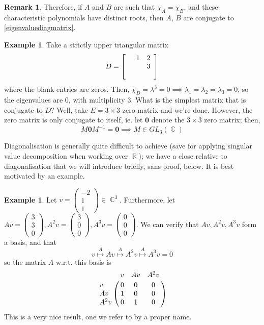 \documentclass[11pt]{amsart} %
\theoremstyle{definition}
\newtheorem{example}[definition]{Example}
\theoremstyle{definition}
\newtheorem{remark}[definition]{Remark}
\DeclareMathOperator{\R}{\mathbb{R}}
\DeclareMathOperator{\Com}{\mathbb{C}}
\numberwithin{equation}{section}
\begin{document}
\begin{remark}
	Therefore, if $A$ and $B$ are such that $\chi_A=\chi_B$, and these characteristic polynomials have distinct roots, then $A$, $B$ are conjugate to \eqref{eigenvaluediagmatrix}.
\end{remark}

\begin{example}
	Take a strictly upper triangular matrix
	$$ D = \left[ \begin{array}{ c c c }
	& 1 & 2 \\
	& & 3\\
	& & 
	\end{array} \right] $$
	where the blank entries are zeros. Then, $\chi_D = \lambda^3 = 0 \implies \lambda_1=\lambda_2=\lambda_3=0$, so the eigenvalues are 0, with multiplicity 3. What is the simplest matrix that is conjugate to $D$? Well, take $E= 3 \times 3$ zero matrix and we're done. However, the zero matrix is only conjugate to itself, ie. let $\mathbf{0}$ denote the $3 \times 3$ zero matrix; then,
	$$ M \mathbf{0} M^{-1} = \mathbf{0} \implies M \in GL_{3} (\Com) $$
\end{example}

Diagonalisation is generally quite difficult to achieve (save for applying singular value decomposition when working over $\R$); we have a close relative to diagonalisation that we will introduce briefly, sans proof, below. It is best motivated by an example.

\begin{example}
	Let $v = \left( \begin{array}{c} -2 \\ 1 \\ 1 \end{array} \right) \in \Com^3$. Furthermore, let $Av = \left( \begin{array}{c} 3 \\ 3 \\ 0 \end{array} \right), A^2 v = \left( \begin{array}{c} 3 \\ 0 \\0  \end{array} \right) , A^3 v = \left( \begin{array}{c} 0 \\ 0 \\ 0 \end{array} \right)  $. We can verify that $Av, A^2 v, A^3 v$ form a basis, and that
	$$ v \overset{A}{\longmapsto} Av \overset{A}{\longmapsto}  A^2 v \overset{A}{\longmapsto}  A^3 v = 0$$
	so the matrix $A$ w.r.t. this basis is
	$$\bordermatrix{  &v &Av &A^2 v \cr
		v& 0 &  0  & 0 \cr
		Av&1  &  0  & 0 \cr
		A^2 v& 0 &  1  & 0 } $$
	This is a very nice result, one we refer to by a proper name.
\end{example}
\end{document}
